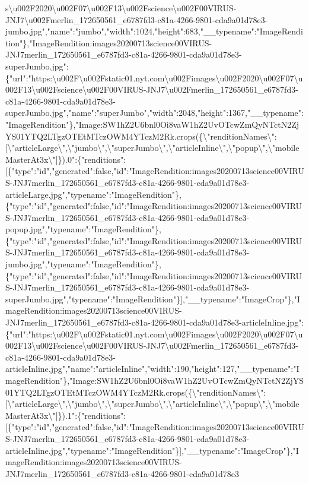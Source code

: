 s\textbackslash{}u002F2020\textbackslash{}u002F07\textbackslash{}u002F13\textbackslash{}u002Fscience\textbackslash{}u002F00VIRUS-JNJ7\textbackslash{}u002Fmerlin\_172650561\_e6787fd3-c81a-4266-9801-cda9a01d78e3-jumbo.jpg","name":"jumbo","width":1024,"height":683,"\_\_typename":"ImageRendition"\},"ImageRendition:images20200713science00VIRUS-JNJ7merlin\_172650561\_e6787fd3-c81a-4266-9801-cda9a01d78e3-superJumbo.jpg":\{"url":"https:\textbackslash{}u002F\textbackslash{}u002Fstatic01.nyt.com\textbackslash{}u002Fimages\textbackslash{}u002F2020\textbackslash{}u002F07\textbackslash{}u002F13\textbackslash{}u002Fscience\textbackslash{}u002F00VIRUS-JNJ7\textbackslash{}u002Fmerlin\_172650561\_e6787fd3-c81a-4266-9801-cda9a01d78e3-superJumbo.jpg","name":"superJumbo","width":2048,"height":1367,"\_\_typename":"ImageRendition"\},"Image:SW1hZ2U6bnl0Oi8vaW1hZ2UvOTcwZmQyNTctN2ZjYS01YTQ2LTgzOTEtMTczOWM4YTczM2Rk.crops(\{\textbackslash{}"renditionNames\textbackslash{}":{[}\textbackslash{}"articleLarge\textbackslash{}",\textbackslash{}"jumbo\textbackslash{}",\textbackslash{}"superJumbo\textbackslash{}",\textbackslash{}"articleInline\textbackslash{}",\textbackslash{}"popup\textbackslash{}",\textbackslash{}"mobileMasterAt3x\textbackslash{}"{]}\}).0":\{"renditions":{[}\{"type":"id","generated":false,"id":"ImageRendition:images20200713science00VIRUS-JNJ7merlin\_172650561\_e6787fd3-c81a-4266-9801-cda9a01d78e3-articleLarge.jpg","typename":"ImageRendition"\},\{"type":"id","generated":false,"id":"ImageRendition:images20200713science00VIRUS-JNJ7merlin\_172650561\_e6787fd3-c81a-4266-9801-cda9a01d78e3-popup.jpg","typename":"ImageRendition"\},\{"type":"id","generated":false,"id":"ImageRendition:images20200713science00VIRUS-JNJ7merlin\_172650561\_e6787fd3-c81a-4266-9801-cda9a01d78e3-jumbo.jpg","typename":"ImageRendition"\},\{"type":"id","generated":false,"id":"ImageRendition:images20200713science00VIRUS-JNJ7merlin\_172650561\_e6787fd3-c81a-4266-9801-cda9a01d78e3-superJumbo.jpg","typename":"ImageRendition"\}{]},"\_\_typename":"ImageCrop"\},"ImageRendition:images20200713science00VIRUS-JNJ7merlin\_172650561\_e6787fd3-c81a-4266-9801-cda9a01d78e3-articleInline.jpg":\{"url":"https:\textbackslash{}u002F\textbackslash{}u002Fstatic01.nyt.com\textbackslash{}u002Fimages\textbackslash{}u002F2020\textbackslash{}u002F07\textbackslash{}u002F13\textbackslash{}u002Fscience\textbackslash{}u002F00VIRUS-JNJ7\textbackslash{}u002Fmerlin\_172650561\_e6787fd3-c81a-4266-9801-cda9a01d78e3-articleInline.jpg","name":"articleInline","width":190,"height":127,"\_\_typename":"ImageRendition"\},"Image:SW1hZ2U6bnl0Oi8vaW1hZ2UvOTcwZmQyNTctN2ZjYS01YTQ2LTgzOTEtMTczOWM4YTczM2Rk.crops(\{\textbackslash{}"renditionNames\textbackslash{}":{[}\textbackslash{}"articleLarge\textbackslash{}",\textbackslash{}"jumbo\textbackslash{}",\textbackslash{}"superJumbo\textbackslash{}",\textbackslash{}"articleInline\textbackslash{}",\textbackslash{}"popup\textbackslash{}",\textbackslash{}"mobileMasterAt3x\textbackslash{}"{]}\}).1":\{"renditions":{[}\{"type":"id","generated":false,"id":"ImageRendition:images20200713science00VIRUS-JNJ7merlin\_172650561\_e6787fd3-c81a-4266-9801-cda9a01d78e3-articleInline.jpg","typename":"ImageRendition"\}{]},"\_\_typename":"ImageCrop"\},"ImageRendition:images20200713science00VIRUS-JNJ7merlin\_172650561\_e6787fd3-c81a-4266-9801-cda9a01d78e3